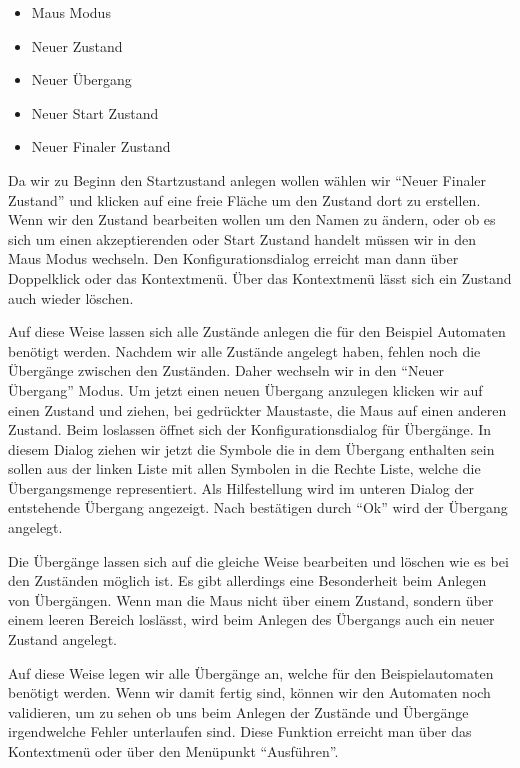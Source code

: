 \begin{itemize}
  \item Maus Modus
  \item Neuer Zustand
  \item Neuer Übergang
  \item Neuer Start Zustand
  \item Neuer Finaler Zustand
\end{itemize}

Da wir zu Beginn den Startzustand anlegen wollen wählen wir "`Neuer Finaler
Zustand"' und klicken auf eine freie Fläche um den Zustand dort zu erstellen.
Wenn wir den Zustand bearbeiten wollen um den Namen zu ändern, oder ob es sich
um einen akzeptierenden oder Start Zustand handelt müssen wir in den Maus Modus
wechseln. Den Konfigurationsdialog erreicht man dann über Doppelklick oder das
Kontextmenü. Über das Kontextmenü lässt sich ein Zustand auch wieder
löschen.\vspace{10pt}

Auf diese Weise lassen sich alle Zustände anlegen die für den Beispiel
Automaten benötigt werden. Nachdem wir alle Zustände angelegt haben, fehlen
noch die Übergänge zwischen den Zuständen. Daher wechseln wir in den "`Neuer
Übergang"' Modus. Um jetzt einen neuen Übergang anzulegen klicken wir auf einen
Zustand und ziehen, bei gedrückter Maustaste, die Maus auf einen anderen
Zustand. Beim loslassen öffnet sich der Konfigurationsdialog für Übergänge. In
diesem Dialog ziehen wir jetzt die Symbole die in dem Übergang enthalten
sein sollen aus der linken Liste mit allen Symbolen in die Rechte Liste, welche
die Übergangsmenge representiert. Als Hilfestellung wird im unteren Dialog der
entstehende Übergang angezeigt. Nach bestätigen durch "`Ok"' wird der
Übergang angelegt.\vspace{10pt}

Die Übergänge lassen sich auf die gleiche Weise bearbeiten und löschen wie
es bei den Zuständen möglich ist. Es gibt allerdings eine Besonderheit beim
Anlegen von Übergängen. Wenn man die Maus nicht über einem Zustand, sondern
über einem leeren Bereich loslässt, wird beim Anlegen des Übergangs auch ein
neuer Zustand angelegt.\vspace{10pt}

Auf diese Weise legen wir alle Übergänge an, welche für den Beispielautomaten
benötigt werden. Wenn wir damit fertig sind, können wir den Automaten noch
validieren, um zu sehen ob uns beim Anlegen der Zustände und Übergänge
irgendwelche Fehler unterlaufen sind. Diese Funktion
erreicht man über das Kontextmenü oder über den Menüpunkt "`Ausführen"'.
